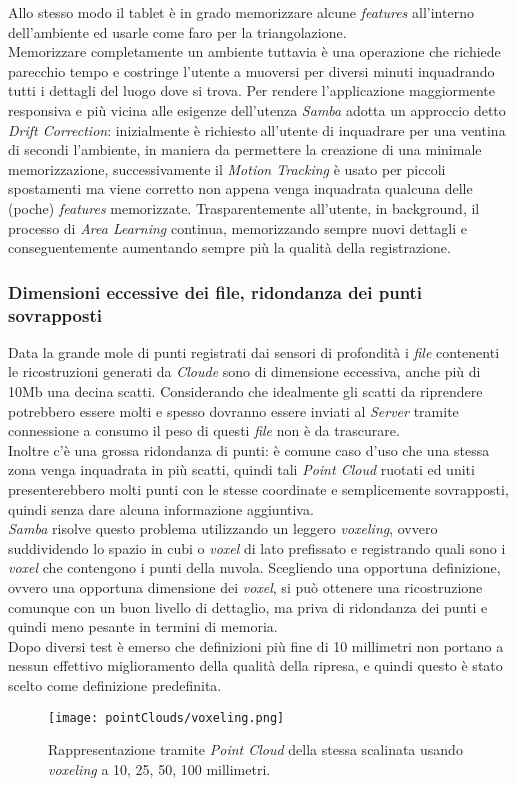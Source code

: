Allo stesso modo il tablet è in grado memorizzare alcune \emph{features} all'interno dell'ambiente ed usarle come faro per la triangolazione. \\
Memorizzare completamente un ambiente tuttavia è una operazione che richiede parecchio tempo e costringe l'utente a muoversi per diversi minuti inquadrando tutti i dettagli del luogo dove si trova. Per rendere l'applicazione maggiormente responsiva e più vicina alle esigenze dell'utenza \emph{Samba} adotta un approccio detto \emph{Drift Correction}: inizialmente è richiesto all'utente di inquadrare per una ventina di secondi l'ambiente, in maniera da permettere la creazione di una minimale memorizzazione, successivamente il \emph{Motion Tracking} è usato per piccoli spostamenti ma viene corretto non appena venga inquadrata qualcuna delle (poche) \emph{features} memorizzate. Trasparentemente all'utente, in background, il processo di \emph{Area Learning} continua, memorizzando sempre nuovi dettagli e conseguentemente aumentando sempre più la qualità della registrazione.\\

\subsubsection{Dimensioni eccessive dei file, ridondanza dei punti sovrapposti}
Data la grande mole di punti registrati dai sensori di profondità i \emph{file} contenenti le ricostruzioni generati da \emph{Cloude} sono di dimensione eccessiva, anche più di 10Mb una decina scatti.
Considerando che idealmente gli scatti da riprendere potrebbero essere molti e spesso dovranno essere inviati al \emph{Server} tramite connessione a consumo il peso di questi \emph{file} non è da trascurare.\\
Inoltre c'è una grossa ridondanza di punti: è comune caso d'uso che una stessa zona venga inquadrata in più scatti, quindi tali \emph{Point Cloud} ruotati ed uniti presenterebbero molti punti con le stesse coordinate e semplicemente sovrapposti, quindi senza dare alcuna informazione aggiuntiva.\\
\emph{Samba} risolve questo problema utilizzando un leggero \emph{voxeling}, ovvero suddividendo lo spazio in cubi o \emph{voxel} di lato prefissato e registrando quali sono i \emph{voxel} che contengono i punti della nuvola.
Scegliendo una opportuna definizione, ovvero una opportuna dimensione dei \emph{voxel}, si può ottenere una ricostruzione comunque con un buon livello di dettaglio, ma priva di ridondanza dei punti e quindi meno pesante in termini di memoria.\\
Dopo diversi test è emerso che definizioni più fine di 10 millimetri non portano a nessun effettivo miglioramento della qualità della ripresa, e quindi questo è stato scelto come definizione predefinita.
\begin{figure}[!h] 
    \centering 
    \texttt{[image: pointClouds/voxeling.png]} 
    \caption{Rappresentazione tramite \emph{Point Cloud} della stessa scalinata usando \emph{voxeling} a 10, 25, 50, 100 millimetri.}
\end{figure}

